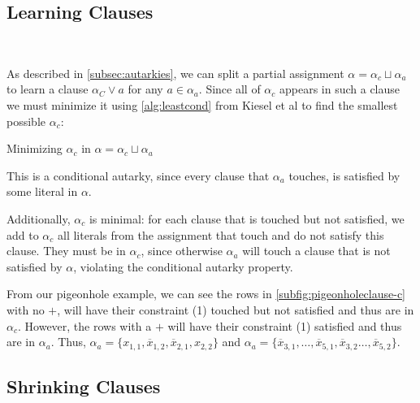 \subsection{Learning Clauses}~\label{subsec:learning}


As described in \autoref{subsec:autarkies}, we can split a partial assignment
$\alpha = \alpha_c \sqcup \alpha_a$ to learn a \pr clause $\alpha_C \lor a$ for
any $a \in \alpha_a$. Since all of $\alpha_c$ appears in such a clause we must
minimize it using \autoref{alg:leastcond} from Kiesel et al
\cite{conditionalautarkies} to find the smallest possible $\alpha_c$:


\begin{algorithm}
    \caption{Minimizing $\alpha_c$ in $\alpha = \alpha_c \sqcup \alpha_a$}\label{alg:leastcond}
    \SetAlgoNoLine

\end{algorithm}

This is a conditional autarky, since every clause that $\alpha_a$ touches, is
satisfied by some literal in $\alpha$.

Additionally, $\alpha_c$ is minimal: for each clause that is touched but not
satisfied, we add to $\alpha_c$ all literals from the assignment that touch and do
not satisfy this clause. They must be in $\alpha_c$, since otherwise $\alpha_a$
will touch a clause that is not satisfied by $\alpha$, violating the conditional
autarky property.

From our pigeonhole example, we can see the rows in
\autoref{subfig:pigeonholeclause-c} with no $+$, will have their constraint (1)
touched but not satisfied and thus are in $\alpha_c$. However, the rows with a
$+$ will have their constraint (1) satisfied and thus are in $\alpha_a$. Thus,
$\alpha_a = \{x_{1, 1}, \overline{x}_{1, 2}, \overline{x}_{2, 1}, x_{2, 2}\}$
and $\alpha_a = \{\overline{x}_{3, 1}, \ldots, \overline{x}_{5, 1}, \overline{x}_{3,
2} \ldots, \overline{x}_{5, 2}\}$.

\subsection{Shrinking Clauses}~\label{subsec:shrinking}

